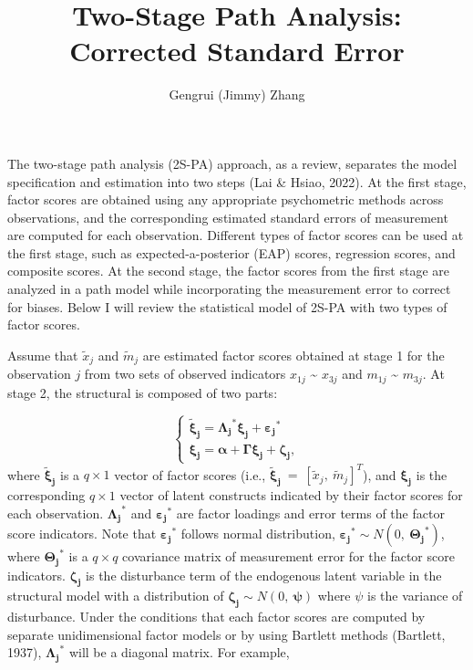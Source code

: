 \documentclass[
  man]{apa7}
\title{Two-Stage Path Analysis: Corrected Standard Error}
\author{Gengrui (Jimmy) Zhang\textsuperscript{}}
\date{}
\affiliation{\phantom{0}}
\begin{document}
\maketitle

The two-stage path analysis (2S-PA) approach, as a review, separates the model specification and estimation into two steps (Lai \& Hsiao, 2022). At the first stage, factor scores are obtained using any appropriate psychometric methods across observations, and the corresponding estimated standard errors of measurement are computed for each observation. Different types of factor scores can be used at the first stage, such as expected-a-posterior (EAP) scores, regression scores, and composite scores. At the second stage, the factor scores from the first stage are analyzed in a path model while incorporating the measurement error to correct for biases. Below I will review the statistical model of 2S-PA with two types of factor scores.

Assume that \(\tilde{x}_{j}\) and \(\tilde{m}_{j}\) are estimated factor scores obtained at stage 1 for the observation \(j\) from two sets of observed indicators \(x_{1j}\) \textasciitilde{} \(x_{3j}\) and \(m_{1j}\) \textasciitilde{} \(m_{3j}\). At stage 2, the structural is composed of two parts:

\begin{equation}
    \begin{cases}
      \boldsymbol{\tilde{\xi}_{j}} = \boldsymbol{\Lambda_{j}}^\text{*}\boldsymbol{\xi_{j}} + \boldsymbol{\varepsilon_{j}}^\text{*} \\
      \boldsymbol{\xi_{j}} = \boldsymbol{\alpha} + \boldsymbol{\Gamma}\boldsymbol{\xi_{j}} + \boldsymbol{\zeta_{j}}, 
    \end{cases}       
\end{equation}
where \(\boldsymbol{\tilde{\xi}_{j}}\) is a \(q \times 1\) vector of factor scores (i.e., \(\boldsymbol{\tilde{\xi}_{j}} \ = \ [\tilde{x}_{j}, \ \tilde{m}_{j}]^T\)), and \(\boldsymbol{\xi_{j}}\) is the corresponding \(q \times 1\) vector of latent constructs indicated by their factor scores for each observation. \(\boldsymbol{\Lambda_{j}}^\text{*}\) and \(\boldsymbol{\varepsilon_{j}}^\text{*}\) are factor loadings and error terms of the factor score indicators. Note that \(\boldsymbol{\varepsilon_{j}}^\text{*}\) follows normal distribution, \(\boldsymbol{\varepsilon_{j}}^\text{*} \sim N(0, \ \boldsymbol{\Theta_{j}}^\text{*})\), where \(\boldsymbol{\Theta_{j}}^\text{*}\) is a \(q \times q\) covariance matrix of measurement error for the factor score indicators. \(\boldsymbol{\zeta_{j}}\) is the disturbance term of the endogenous latent variable in the structural model with a distribution of \(\boldsymbol{\zeta_{j}} \sim N(0, \ \boldsymbol{\psi})\) where \(\psi\) is the variance of disturbance. Under the conditions that each factor scores are computed by separate unidimensional factor models or by using Bartlett methods (Bartlett, 1937), \(\boldsymbol{\Lambda_{j}}^\text{*}\) will be a diagonal matrix. For example,
\end{document}
